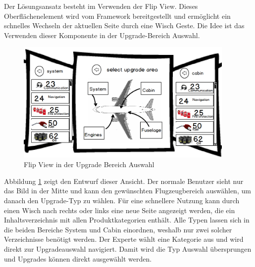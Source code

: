 Der Lösungsansatz besteht im Verwenden der Flip View. Dieses Oberflächenelement wird vom Framework bereitgestellt und ermöglicht ein schnelles Wechseln der aktuellen Seite durch eine Wisch Geste. Die Idee ist das Verwenden dieser Komponente in der Upgrade-Bereich Auswahl. 
\begin{figure}
\centering
\includegraphics[width=400px]{images/flipView}
\caption{Flip View in der Upgrade Bereich Auswahl}
\label{flip}
\end{figure}
Abbildung \ref{flip} zeigt den Entwurf dieser Ansicht. Der normale Benutzer sieht nur das Bild in der Mitte und kann den gewünschten Flugzeugbereich auswählen, um danach den Upgrade-Typ zu wählen. Für eine schnellere Nutzung kann durch einen Wisch nach rechts oder links eine neue Seite angezeigt werden, die ein Inhaltsverzeichnis mit allen Produktkategorien enthält. Alle Typen lassen sich in die beiden Bereiche System und Cabin einordnen, weshalb nur zwei solcher Verzeichnisse benötigt werden. Der Experte wählt eine Kategorie aus und wird direkt zur Upgradeauswahl navigiert. Damit wird die Typ Auswahl übersprungen und  Upgrades können direkt ausgewählt werden.

